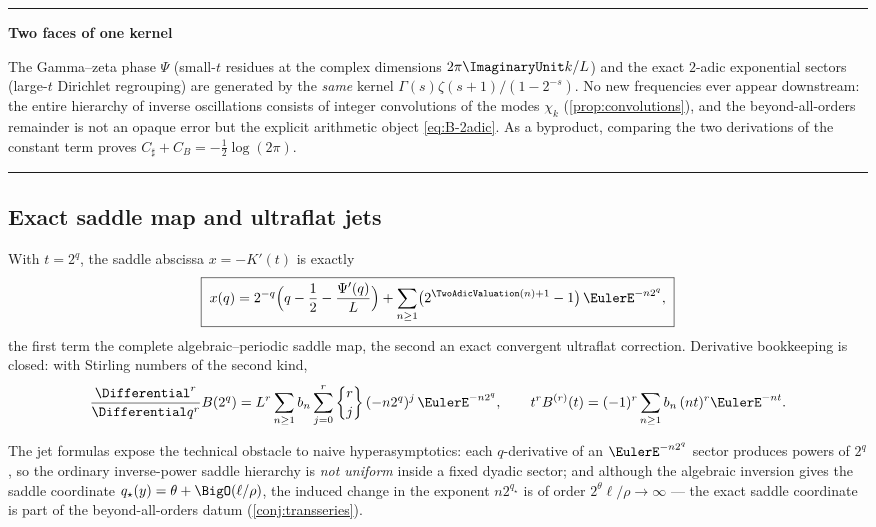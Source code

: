 \documentclass[11pt,oneside]{article}
\numberwithin{equation}{section}
\theoremstyle{definition}
\theoremstyle{remark}
\newcommand{\Csharp}{C_{\sharp}}
\newcommand{\CB}{C_{B}}
\newenvironment{statusbox}[1]{%
  \par\smallskip\noindent\begin{center}\begin{minipage}{0.94\textwidth}%
  \hrule\vspace{0.5em}\noindent\textbf{#1}\par\smallskip
}{%
  \vspace{0.5em}\hrule\end{minipage}\end{center}\smallskip
}
\begin{document}
\begin{statusbox}{Two faces of one kernel}
The Gamma--zeta phase $\Psi$ (small-$t$ residues at the complex
dimensions $2\pi\ImaginaryUnit k/L$) and the exact $2$-adic exponential sectors
(large-$t$ Dirichlet regrouping) are generated by the \emph{same}
kernel $\Gamma(s)\zeta(s+1)/(1-2^{-s})$.  No new frequencies ever
appear downstream: the entire hierarchy of inverse oscillations
consists of integer convolutions of the modes
$\chi_k$ (\cref{prop:convolutions}), and the beyond-all-orders
remainder is not an opaque error but the explicit arithmetic object
\eqref{eq:B-2adic}.  As a byproduct, comparing the two derivations
of the constant term proves $\Csharp+\CB=-\tfrac12\log(2\pi)$.
\end{statusbox}

\subsection{Exact saddle map and ultraflat jets}

\begin{corollary}
\label{cor:saddle-map}
With $t=2^{q}$, the saddle abscissa $x=-K'(t)$ is exactly
\begin{equation}
 \boxed{\;
 x(q)=2^{-q}\Bigl(q-\frac12-\frac{\Psi'(q)}{L}\Bigr)
 +\sum_{n\ge1}\bigl(2^{\TwoAdicValuation(n)+1}-1\bigr)\,\EulerE^{-n2^{q}},
 \;}
 \label{eq:saddle-map}
\end{equation}
the first term the complete algebraic--periodic saddle map, the
second an exact convergent ultraflat correction.  Derivative
bookkeeping is closed: with Stirling numbers of the second kind,
\begin{equation}
 \frac{\Differential^{r}}{\Differential q^{r}}B(2^{q})
 =L^{r}\sum_{n\ge1}b_n
 \sum_{j=0}^{r}
 \genfrac\{\}{0pt}{}{r}{j}\,(-n2^{q})^{j}\,\EulerE^{-n2^{q}},
 \qquad
 t^{r}B^{(r)}(t)=(-1)^{r}\sum_{n\ge1}b_n\,(nt)^{r}\EulerE^{-nt}.
 \label{eq:touchard-jets}
\end{equation}
\end{corollary}

The jet formulas expose the technical obstacle to naive
hyperasymptotics: each $q$-derivative of an
$\EulerE^{-n2^{q}}$ sector produces powers of $2^{q}$, so the ordinary
inverse-power saddle hierarchy is \emph{not uniform} inside a fixed
dyadic sector; and although the algebraic inversion gives the saddle
coordinate $q_\star(y)=\theta+\BigO(\ell/\rho)$, the induced change
in the exponent $n2^{q_\star}$ is of order
$2^{\theta}\ell/\rho\to\infty$ --- the exact saddle coordinate is
part of the beyond-all-orders datum
(\cref{conj:transseries}).
\end{document}
